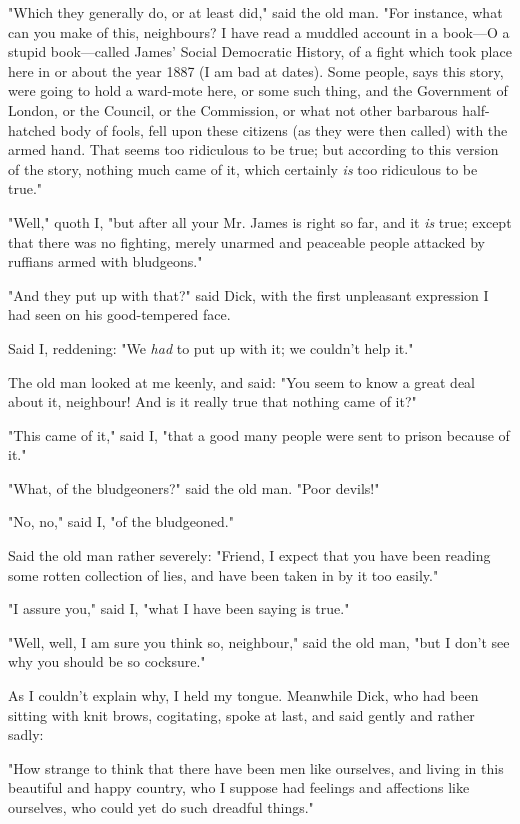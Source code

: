 "Which they generally do, or at least did," said the old man. "For
instance, what can you make of this, neighbours? I have read a muddled
account in a book---O a stupid book---called James' Social Democratic
History, of a fight which took place here in or about the year 1887 (I
am bad at dates). Some people, says this story, were going to hold a
ward-mote here, or some such thing, and the Government of London, or the
Council, or the Commission, or what not other barbarous half-hatched
body of fools, fell upon these citizens (as they were then called) with
the armed hand. That seems too ridiculous to be true; but according to
this version of the story, nothing much came of it, which certainly
\emph{is} too ridiculous to be true."

"Well," quoth I, "but after all your Mr. James is right so far, and it
\emph{is} true; except that there was no fighting, merely unarmed and
peaceable people attacked by ruffians armed with bludgeons."

"And they put up with that?" said Dick, with the first unpleasant
expression I had seen on his good-tempered face.

Said I, reddening: "We \emph{had} to put up with it; we couldn't help
it."

The old man looked at me keenly, and said: "You seem to know a great
deal about it, neighbour! And is it really true that nothing came of
it?"

"This came of it," said I, "that a good many people were sent to prison
because of it."

"What, of the bludgeoners?" said the old man. "Poor devils!"

"No, no," said I, "of the bludgeoned."

Said the old man rather severely: "Friend, I expect that you have been
reading some rotten collection of lies, and have been taken in by it too
easily."

"I assure you," said I, "what I have been saying is true."

"Well, well, I am sure you think so, neighbour," said the old man, "but
I don't see why you should be so cocksure."

As I couldn't explain why, I held my tongue. Meanwhile Dick, who had
been sitting with knit brows, cogitating, spoke at last, and said gently
and rather sadly:

"How strange to think that there have been men like ourselves, and
living in this beautiful and happy country, who I suppose had feelings
and affections like ourselves, who could yet do such dreadful things."

